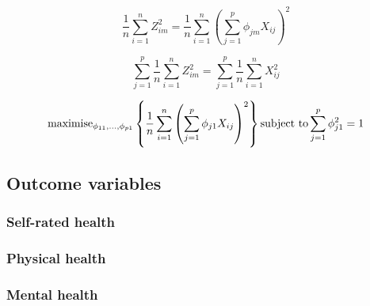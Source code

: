 \begin{equation}
    \label{eq:pca_variance}
    \frac{1}{n} \sum_{i=1}^{n}Z_{im}^2 = \frac{1}{n} \sum_{i=1}^{n} \left( \sum_{j=1}^{p} \phi_{jm}X_{ij} \right)^2
\end{equation}


\begin{equation}
    \label{eq:pca_total_variance}
    \sum_{j=1}^{p} \frac{1}{n} \sum_{i=1}^{n}Z_{im}^2 = \sum_{j=1}^{p} \frac{1}{n} \sum_{i=1}^{n}X_{ij}^2
\end{equation}


\begin{equation}
    \label{eq:pca_algorithm}
    \textnormal{maximise}_{\phi_{11}, \ldots, \phi_{p1}} \left\{ \frac{1}{n} \sum_{i=1}^{n} \left( \sum_{j=1}^{p} \phi_{j1} X_{ij} \right)^2 \right\} \textnormal{subject to} \sum_{j=1}^{p} \phi_{j1}^2 = 1
\end{equation}

\subsection{Outcome variables}
\subsubsection{Self-rated health}

\subsubsection{Physical health}

\subsubsection{Mental health}


